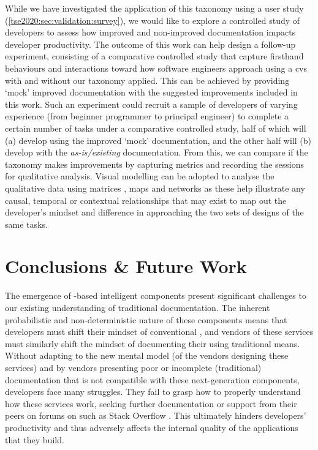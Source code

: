 While we have investigated the application of this taxonomy using a user study (\cref{tse2020:sec:validation:survey}), we would like to explore a controlled study of developers to assess how improved and non-improved  documentation impacts developer productivity. The outcome of this work can help design a follow-up experiment, consisting of a comparative controlled study \citep{Seaman:2007wa} that capture firsthand behaviours and interactions toward how software engineers approach using a \gls{cvs} with and without our taxonomy applied. This can be achieved by providing `mock' improved documentation with the suggested improvements included in this work. Such an experiment could recruit a sample of developers of varying experience (from beginner programmer to principal engineer) to complete a certain number of tasks under a comparative controlled study, half of which will (a) develop using the improved `mock' documentation, and the other half will (b) develop with the \textit{as-is/existing} documentation. From this, we can compare if the taxonomy makes improvements by capturing metrics and recording the sessions for qualitative analysis. Visual modelling can be adopted to analyse the qualitative data using matrices \citep{Dey:2003ty}, maps and networks \citep{Miles:1994ty} as these help illustrate any causal, temporal or contextual relationships that may exist to map out the developer's mindset and difference in approaching the two sets of designs of the same tasks.

\section{Conclusions \& Future Work}
\label{tse2020:sec:conclusions}

The emergence of -based intelligent components present significant challenges to our existing understanding of traditional  documentation. The inherent probabilistic and non-deterministic nature of these components means that developers must shift their mindset of conventional , and vendors of these services must similarly shift the mindset of documenting their  using traditional means. Without adapting to the new mental model (of the vendors designing these services) and by vendors presenting poor or incomplete (traditional) documentation that is not compatible with these next-generation components, developers face many struggles. They fail to grasp how to properly understand how these services work, seeking further documentation or support from their peers on forums on such as Stack Overflow \citep{Cummaudo:2020icse}. This ultimately hinders developers' productivity and thus adversely affects the internal quality of the applications that they build.

